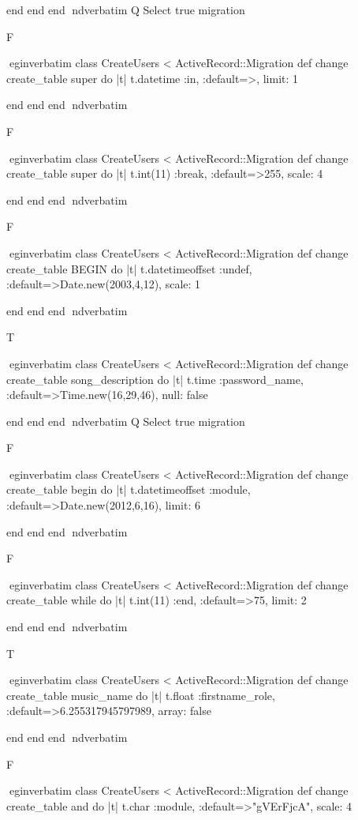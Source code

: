     end 
  end 
end
nd{verbatim}
Q
 Select true migration

F

egin{verbatim}
 class CreateUsers < ActiveRecord::Migration 
  def change 
    create_table super do |t| 
      t.datetime :in, :default=>, limit: 1
    
    end 
  end 
end
nd{verbatim}

F

egin{verbatim}
 class CreateUsers < ActiveRecord::Migration 
  def change 
    create_table super do |t| 
      t.int(11) :break, :default=>255, scale: 4
    
    end 
  end 
end
nd{verbatim}

F

egin{verbatim}
 class CreateUsers < ActiveRecord::Migration 
  def change 
    create_table BEGIN do |t| 
      t.datetimeoffset :undef, :default=>Date.new(2003,4,12), scale: 1
    
    end 
  end 
end
nd{verbatim}

T

egin{verbatim}
 class CreateUsers < ActiveRecord::Migration 
  def change 
    create_table song_description do |t| 
      t.time :password_name, :default=>Time.new(16,29,46), null: false
    
    end 
  end 
end
nd{verbatim}
Q
 Select true migration

F

egin{verbatim}
 class CreateUsers < ActiveRecord::Migration 
  def change 
    create_table begin do |t| 
      t.datetimeoffset :module, :default=>Date.new(2012,6,16), limit: 6
    
    end 
  end 
end
nd{verbatim}

F

egin{verbatim}
 class CreateUsers < ActiveRecord::Migration 
  def change 
    create_table while do |t| 
      t.int(11) :end, :default=>75, limit: 2
    
    end 
  end 
end
nd{verbatim}

T

egin{verbatim}
 class CreateUsers < ActiveRecord::Migration 
  def change 
    create_table music_name do |t| 
      t.float :firstname_role, :default=>6.255317945797989, array: false
    
    end 
  end 
end
nd{verbatim}

F

egin{verbatim}
 class CreateUsers < ActiveRecord::Migration 
  def change 
    create_table and do |t| 
      t.char :module, :default=>"gVErFjcA", scale: 4
    
